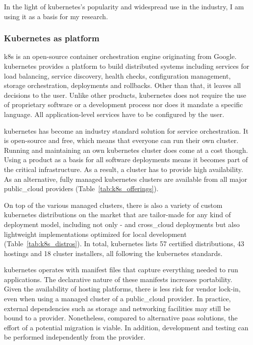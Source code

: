\documentclass[../main.tex]{subfiles}
\begin{document}
    In the light of \gls{kubernetes}'s popularity and widespread use in the industry, I am using it as a basis for my research.

    \subsubsection{Kubernetes as platform}

    \acrfull{k8s} is an open-source container orchestration engine originating from Google.
    \gls{kubernetes} provides a platform to build distributed systems including services for load balancing, service discovery, health checks, configuration management, storage orchestration, deployments and rollbacks.
    Other than that, it leaves all decisions to the user.
    Unlike other products, \gls{kubernetes} does not require the use of proprietary software or a development process nor does it mandate a specific language.
    All application-level services have to be configured by the user.\cite{k8s_what_is}

    \gls{kubernetes} has become an industry standard solution for service orchestration\cite{cn_devops_with_k8s_c1}.
    It is open-source and free, which means that everyone can run their own cluster.
    Running and maintaining an own \gls{kubernetes} cluster does come at a cost though.
    Using a product as a basis for all software deployments means it becomes part of the critical infrastructure.
    As a result, a cluster has to provide high availability.
    As an alternative, fully managed \gls{kubernetes} clusters are available from all major \gls{public_cloud} providers (Table~\ref{tab:k8s_offerings}).

    

    On top of the various managed clusters, there is also a variety of custom \gls{kubernetes} distributions on the market that are tailor-made for any kind of deployment model, including not only - and \gls{cross_cloud} deployments but also lightweight implementations optimized for local development (Table~\ref{tab:k8s_distros}).
    In total, \gls{kubernetes} lists 57 certified distributions, 43 hostings and 18 cluster installers, all following the \gls{kubernetes} standards.\cite{k8s_conformance}

    

    \gls{kubernetes} operates with manifest files that capture everything needed to run applications.
    The declarative nature of these manifests increases portability.
    Given the availability of hosting platforms, there is less risk for vendor lock-in, even when using a managed cluster of a \gls{public_cloud} provider.
    In practice, external dependencies such as storage and networking facilities may still be bound to a provider.
    Nonetheless, compared to alternative \acrshort{paas} solutions, the effort of a potential migration is viable.
    In addition, development and testing can be performed independently from the provider.
\end{document}
